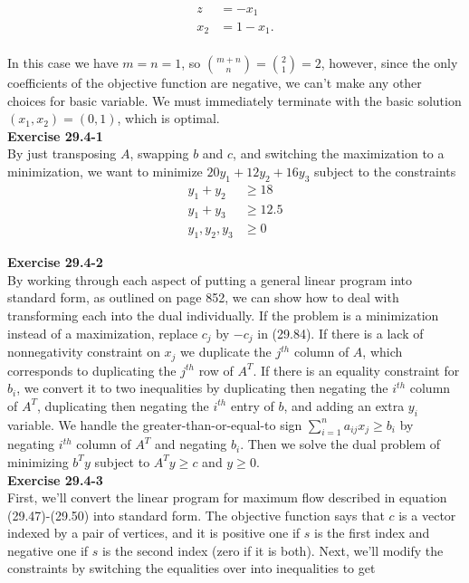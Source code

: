 \documentclass{article}
\begin{document}
\begin{align*}
z &= -x_1\\
x_2 &= 1 - x_1. \\
\end{align*}

In this case we have $m = n = 1$, so ${m+n \choose n} = {2 \choose 1} = 2$, however, since the only coefficients of the objective function are negative, we can't make any other choices for basic variable.  We must immediately terminate with the basic solution $(x_1,x_2) = (0,1)$, which is optimal. \\

\noindent\textbf{Exercise 29.4-1}\\

By just transposing $A$, swapping $b$ and $c$, and switching the maximization to a minimization, we want to minimize $20y_1 + 12 y_2 + 16 y_3$ subject to the constraints 
\begin{align*}
y_1 + y_2 &\ge 18\\
y_1 + y_3 &\ge 12.5\\
y_1,y_2,y_3 &\ge 0
\end{align*}

\noindent\textbf{Exercise 29.4-2}\\

By working through each aspect of putting a general linear program into standard form, as outlined on page 852, we can show how to deal with transforming each into the dual individually.  If the problem is a minimization instead of a maximization, replace $c_j$ by $-c_j$ in (29.84).  If there is a lack of nonnegativity constraint on $x_j$ we duplicate the $j^{th}$ column of $A$, which corresponds to duplicating the $j^{th}$ row of $A^T$.  If there is an equality constraint for $b_i$, we convert it to two inequalities by duplicating then negating the $i^{th}$ column of $A^T$, duplicating then negating the $i^{th}$ entry of $b$, and adding an extra $y_i$ variable.  We handle the greater-than-or-equal-to sign $\sum_{i=1}^n a_{ij}x_j \geq b_i$ by negating $i^{th}$ column of $A^T$ and negating $b_i$.  Then we solve the dual problem of minimizing $b^Ty$ subject to $A^Ty \geq c$ and $y \geq 0$.  \\

\noindent\textbf{Exercise 29.4-3}\\

First, we'll convert the linear program for maximum flow described in equation (29.47)-(29.50) into standard form. The objective function says that $c$ is a vector indexed by a pair of vertices, and it is positive one if $s$ is the first index and negative one if $s$ is the second index (zero if it is both). Next, we'll modify the constraints by switching the equalities over into inequalities to get
\end{document}
